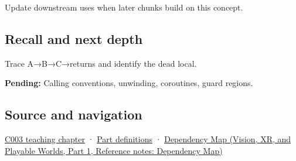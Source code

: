 \hypertarget{appendix-b081b7abe193-used-by}{}

Update downstream uses when later chunks build on this concept.

\subsection{Recall and next depth}\label{appendix-b081b7abe193-recall-and-next-depth}

\hypertarget{appendix-b081b7abe193-recall-and-next-depth}{}

Trace A→B→C→returns and identify the dead local.

\textbf{Pending:} Calling conventions, unwinding, coroutines, guard regions.

\subsection{Source and navigation}\label{appendix-b081b7abe193-source-and-navigation}

\hypertarget{appendix-b081b7abe193-source-and-navigation}{}

\hyperref[01-foundations-i-ch002-where-the-bytes-live]{C003 teaching chapter} · \hyperref[appendix-fd090d982a15-m003---parts-41-60]{Part definitions} · \href{../07-Vision-XR-and-Playable-Worlds-P01/main.pdf\#nameddest=appendix-4ad47bdd269a}{Dependency Map (Vision, XR, and Playable Worlds, Part 1, Reference notes: Dependency Map)}
